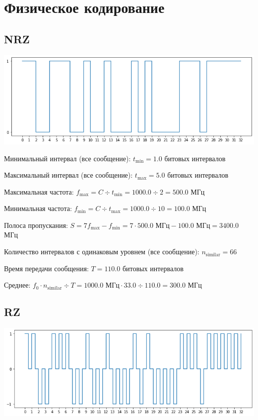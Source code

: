 \section{Физическое кодирование}
\subsection{NRZ}
\includegraphics[width=\textwidth]{2nrz}

Минимальный интервал (все сообщение): $t_\mathrm{min}=1.0$ битовых интервалов

Максимальный интервал (все сообщение): $t_\mathrm{max}=5.0$ битовых интервалов

Максимальная частота: $f_\mathrm{max}=C\div t_\mathrm{min}=1000.0\div 2=500.0$ МГц

Минимальная частота: $f_\mathrm{min}=C\div t_\mathrm{max}=1000.0\div 10=100.0$ МГц

Полоса пропускания: $S=7f_\mathrm{max}-f_\mathrm{min} = 7\cdot 500.0\text{ МГц}-100.0\text{ МГц}=3400.0$ МГц

Количество интервалов с одинаковым уровнем (все сообщение): $n_\mathrm{similar}=66$

Время передачи сообщения: $T=110.0$ битовых интервалов

Среднее: $f_0\cdot n_\mathrm{similar}\div T=1000.0\text{ МГц}\cdot 33.0\div 110.0=300.0$ МГц

\subsection{RZ}
\includegraphics[width=\textwidth]{2rz}


